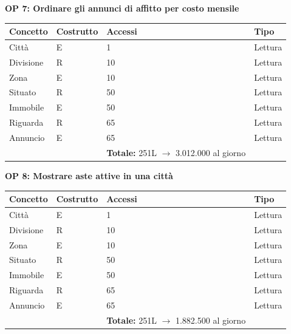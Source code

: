 \documentclass[a4paper,12pt]{report}
\begin{document}
            \noindent
            \textbf{OP 7: Ordinare gli annunci di affitto per costo mensile}
        	\begin{table}[H]
            \centering
             \begin{tabular}{llll}
             \rowcolor{yellow!20} \textbf{Concetto} & \textbf{Costrutto} & \textbf{Accessi} & \textbf{Tipo}\\ [0.5ex] 
             \hline
             Città & E & 1 & Lettura \\ 
             Divisione & R & 10 & Lettura \\ 
             Zona & E & 10 & Lettura \\ 
             Situato & R & 50 & Lettura \\ 
             Immobile & E & 50 & Lettura \\ 
             Riguarda & R & 65 & Lettura \\ 
             Annuncio & E & 65 & Lettura \\ 
             \hline
                \rowcolor{yellow!20} &   & \textbf{Totale:} 251L $\rightarrow$ 3.012.000 al giorno &  \\ [1ex] 
             
             \end{tabular}
            \end{table}

            \newpage
            \noindent
            \textbf{OP 8: Mostrare aste attive in una città}
        	\begin{table}[H]
            \centering
             \begin{tabular}{llll}
             \rowcolor{yellow!20} \textbf{Concetto} & \textbf{Costrutto} & \textbf{Accessi} & \textbf{Tipo}\\ [0.5ex] 
             \hline
             Città & E & 1 & Lettura \\ 
             Divisione & R & 10 & Lettura \\ 
             Zona & E & 10 & Lettura \\ 
             Situato & R & 50 & Lettura \\ 
             Immobile & E & 50 & Lettura \\ 
             Riguarda & R & 65 & Lettura \\ 
             Annuncio & E & 65 & Lettura \\ 
             \hline
                \rowcolor{yellow!20} &   & \textbf{Totale:} 251L $\rightarrow$ 1.882.500 al giorno &  \\ [1ex] 
             
             \end{tabular}
            \end{table}
\end{document}
